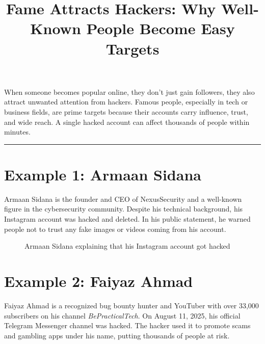\documentclass[12pt]{article}
\begin{document}
\title{\color{accent}\textbf{Fame Attracts Hackers: Why Well-Known People Become Easy Targets}}
\author{}
\date{}
\maketitle

When someone becomes popular online, they don't just gain followers, they also attract unwanted attention from hackers. Famous people, especially in tech or business fields, are prime targets because their accounts carry influence, trust, and wide reach. A single hacked account can affect thousands of people within minutes.

\vspace{0.5cm}
\hrule
\vspace{0.5cm}

\section*{Example 1: Armaan Sidana}

Armaan Sidana is the founder and CEO of NexusSecurity and a well-known figure in the cybersecurity community. Despite his technical background, his Instagram account was hacked and deleted. In his public statement, he warned people not to trust any fake images or videos coming from his account.

\begin{figure}[H]
    \centering
    \caption{Armaan Sidana explaining that his Instagram account got hacked}
\end{figure}

\section*{Example 2: Faiyaz Ahmad}

Faiyaz Ahmad is a recognized bug bounty hunter and YouTuber with over 33,000 subscribers on his channel \textit{BePracticalTech}. On August 11, 2025, his official Telegram Messenger channel was hacked. The hacker used it to promote scams and gambling apps under his name, putting thousands of people at risk.
\end{document}
